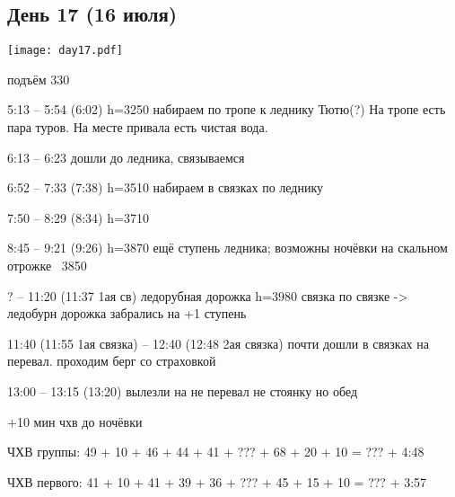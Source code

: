 \graphicspath{{Pictures/Chapter5/Day17}}


\subsection{День 17 (16 июля)}\label{subsec:Day17}
    \parbox[c]{\textwidth}{%
        \texttt{[image: day17.pdf]}\label{fig:Day17_map}%
    }
    \vspace{0.8cm}
    
подъём 330

5:13 --  5:54 (6:02) h=3250
набираем по тропе к леднику Тютю(?) На тропе есть пара туров. На месте привала есть чистая вода.

6:13 -- 6:23 дошли до ледника, связываемся

6:52 -- 7:33 (7:38) h=3510 набираем в связках по леднику

7:50 -- 8:29 (8:34) h=3710

8:45 -- 9:21 (9:26) h=3870
ещё ступень ледника; возможны ночёвки на скальном отрожке ~3850

? -- 11:20 (11:37 1ая св) ледорубная дорожка h=3980 связка по связке -> ледобурн дорожка
забрались на +1 ступень

11:40 (11:55 1ая связка) -- 12:40 (12:48 2ая связка)
почти дошли в связках на перевал. проходим берг со страховкой

13:00 -- 13:15 (13:20) вылезли на не перевал не стоянку но обед

+10 мин чхв до ночёвки


ЧХВ группы: 49 + 10 + 46 + 44 + 41 + ??? + 68 + 20 + 10 = ??? + 4:48

ЧХВ первого: 41 + 10 + 41 + 39 + 36 + ??? + 45 + 15 + 10 = ??? + 3:57

    \FloatBarrier